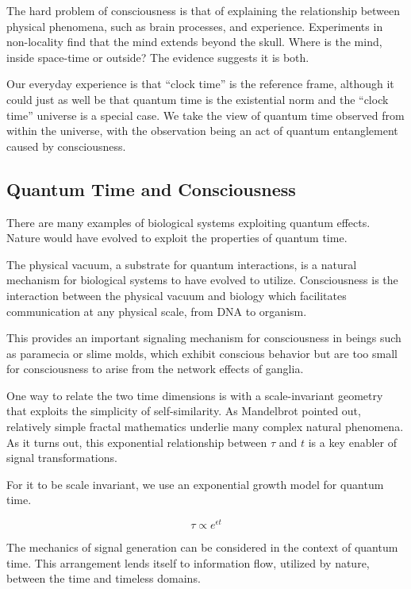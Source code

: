 The hard problem of consciousness \cite{Chalmers} is that of explaining the
relationship between physical phenomena, such as brain processes,
and experience.
Experiments in non-locality \cite{Achterberg} find that the mind extends beyond
the skull. Where is the mind, inside space-time or outside?
The evidence suggests it is both.

Our everyday experience is that ``clock time'' is the reference frame,
although it could just as well be that quantum time is the existential norm
and the ``clock time'' universe is a special case.
We take the view of quantum time observed from within the universe, with
the observation being an act of quantum entanglement caused by consciousness.

\subsection{Quantum Time and Consciousness}

There are many examples of biological systems exploiting quantum effects.
Nature would have evolved to exploit the properties of quantum time.

The physical vacuum, a substrate for quantum interactions,
is a natural mechanism for biological systems to have evolved to utilize.
Consciousness is the interaction between the physical vacuum and biology which
facilitates communication at any physical scale, from DNA to organism.

This provides an important signaling mechanism for consciousness in beings such
as paramecia or slime molds, which exhibit conscious behavior but are too small
for consciousness to arise from the network effects of ganglia.

One way to relate the two time dimensions is with a scale-invariant geometry
that exploits the simplicity of self-similarity.
As Mandelbrot \cite{Mandelbrot} pointed out, relatively simple fractal
mathematics underlie many complex natural phenomena.
As it turns out, this exponential relationship between $\tau$ and $t$
is a key enabler of signal transformations.

For it to be scale invariant,
we use an exponential growth model for quantum time.

\begin{equation} \label{eq:pink}
\tau \propto e^{\epsilon t}
\end{equation}

The mechanics of signal generation can be considered in the context of
quantum time.
This arrangement lends itself to information flow, utilized by nature,
between the time and timeless domains.

